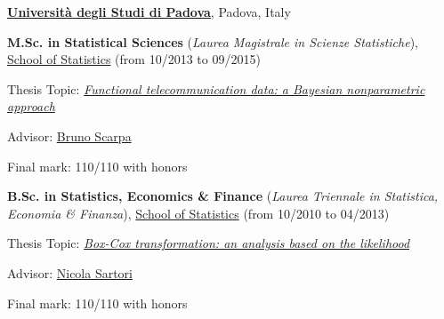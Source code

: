 \documentclass[10pt]{article}
\newenvironment{outerlist}[1][\enskip\tiny\textbullet]%
        {\begin{itemize}[#1]}{\end{itemize}%
         \vspace{-.6\baselineskip}}
\newenvironment{innerlist}[1][\enskip\tiny\textbullet]%
        {\begin{compactitem}[#1]}{\end{compactitem}}
\newcommand{\blankline}{\quad\pagebreak[2]}
\begin{document}
\blankline

\href{http://www.unipd.it}{\textbf{Universit\`a degli Studi di Padova}}, Padova, Italy
\begin{outerlist}
\item[] \textbf{M.Sc. in Statistical Sciences} (\textit{Laurea Magistrale in Scienze Statistiche}), 
        \href{http://www.stat.unipd.it/}{School of Statistics} (from 10/2013 to 09/2015)
        \begin{innerlist}
        \item Thesis Topic: \href{http://tesi.cab.unipd.it/49380/1/Rigon_Tommaso.pdf}{\emph{Functional telecommunication data: a Bayesian nonparametric approach}}
        \item Advisor: \href{https://homes.stat.unipd.it/brunoscarpa/}{Bruno Scarpa}
        \item Final mark: 110/110 with honors
        \end{innerlist}
\item[] \textbf{B.Sc. in Statistics, Economics \& Finance} (\textit{Laurea Triennale in Statistica, Economia \& Finanza}), 
        \href{http://www.stat.unipd.it/}
             {School of Statistics} (from 10/2010 to 04/2013)
                     \begin{innerlist}
        \item Thesis Topic: \href{http://tesi.cab.unipd.it/42884/1/Rigon_Tommaso.pdf}{\emph{Box-Cox transformation: an analysis based on the likelihood}}
        \item Advisor:  \href{https://homes.stat.unipd.it/nicolasartori/}{Nicola Sartori}
        \item Final mark: 110/110 with honors
        \end{innerlist}
\end{outerlist}
\end{document}
